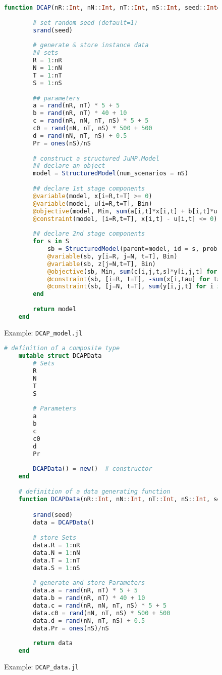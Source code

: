 \begin{figure}[]
	\centering
	\begin{lstlisting}[frame=single,language=julia]
	function DCAP(nR::Int, nN::Int, nT::Int, nS::Int, seed::Int=1)::JuMP.Model
		
		# set random seed (default=1)
		srand(seed)
		
		# generate & store instance data
		## sets
		R = 1:nR
		N = 1:nN
		T = 1:nT
		S = 1:nS
		
		## parameters
		a = rand(nR, nT) * 5 + 5
		b = rand(nR, nT) * 40 + 10
		c = rand(nR, nN, nT, nS) * 5 + 5
		c0 = rand(nN, nT, nS) * 500 + 500
		d = rand(nN, nT, nS) + 0.5
		Pr = ones(nS)/nS
		
		# construct a structured JuMP.Model
		## declare an object
		model = StructuredModel(num_scenarios = nS)
		
		## declare 1st stage components
		@variable(model, x[i=R,t=T] >= 0)
		@variable(model, u[i=R,t=T], Bin)
		@objective(model, Min, sum(a[i,t]*x[i,t] + b[i,t]*u[i,t] for i in R for t in T))
		@constraint(model, [i=R,t=T], x[i,t] - u[i,t] <= 0)
		
		## declare 2nd stage components
		for s in S
			sb = StructuredModel(parent=model, id = s, prob = Pr[s])
			@variable(sb, y[i=R, j=N, t=T], Bin)
        	@variable(sb, z[j=N,t=T], Bin)
			@objective(sb, Min, sum(c[i,j,t,s]*y[i,j,t] for i in R for j in N for t in T) + sum(c0[j,t,s]*z[j,t] for j in N for t in T))
			@constraint(sb, [i=R, t=T], -sum(x[i,tau] for tau in 1:t) + sum(d[j,t,s]*y[i,j,t] for j in N) <= 0)
			@constraint(sb, [j=N, t=T], sum(y[i,j,t] for i in R) + z[j,t] == 1)
		end
		
		return model
	end

	\end{lstlisting}
	\caption{Example: \texttt{DCAP\_model.jl}}\label{fig:DCAP_model.jl}
\end{figure}

\begin{figure}[]
	\centering
	\begin{lstlisting}[frame=single,language=julia]
	# definition of a composite type
	mutable struct DCAPData	
		# Sets
		R   
		N  
		T   
		S  
		
		# Parameters
		a   
		b   
		c  
		c0  
		d   
		Pr  
		
		DCAPData() = new()	# constructor
	end
	
	# definition of a data generating function
	function DCAPData(nR::Int, nN::Int, nT::Int, nS::Int, seed::Int)::DCAPData

		srand(seed)
		data = DCAPData()
		
		# store Sets
		data.R = 1:nR	
		data.N = 1:nN	
		data.T = 1:nT	
		data.S = 1:nS	
		
		# generate and store Parameters
		data.a = rand(nR, nT) * 5 + 5
		data.b = rand(nR, nT) * 40 + 10	
		data.c = rand(nR, nN, nT, nS) * 5 + 5	
		data.c0 = rand(nN, nT, nS) * 500 + 500	
		data.d = rand(nN, nT, nS) + 0.5	
		data.Pr = ones(nS)/nS
		
		return data
	end
	\end{lstlisting}
	\caption{Example: \texttt{DCAP\_data.jl}}
	\label{fig:DCAP_data.jl}
\end{figure}

